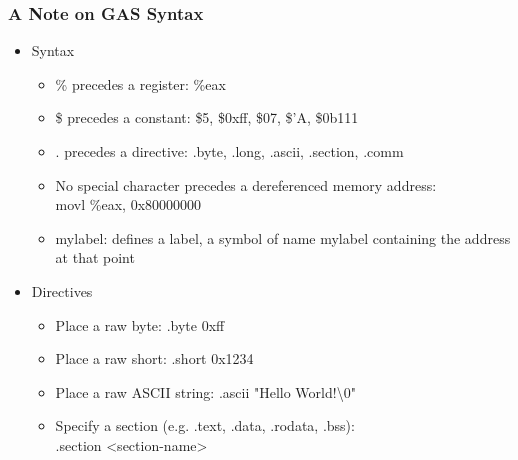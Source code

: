 \documentclass[11pt,xcolor=dvipsnames]{beamer}
\begin{document}
\begin{frame}[fragile,t]
\frametitle{A Note on GAS Syntax}
\begin{itemize}
    \item Syntax
    \begin{itemize}
        \item {\ttfamily \%} precedes a register: {\ttfamily \%eax}
        \item {\ttfamily \$} precedes a constant: {\ttfamily \$5, \$0xff, \$07, \$'A, \$0b111}
        \item {\ttfamily .} precedes a directive: {\ttfamily .byte, .long, .ascii, .section, .comm}
        \item No special character precedes a dereferenced memory address: \\ {\ttfamily movl \%eax, 0x80000000}
        \item {\ttfamily mylabel:} defines a label, a symbol of name {\ttfamily mylabel} containing the address at that point
    \end{itemize}
    \item Directives
    \begin{itemize}
        \item Place a raw byte: {\ttfamily .byte 0xff}
        \item Place a raw short: {\ttfamily .short 0x1234}
        \item Place a raw ASCII string: {\ttfamily .ascii "Hello World!\textbackslash0"}
        \item Specify a section (e.g. .text, .data, .rodata, .bss): \\ {\ttfamily .section <section-name>}
    \end{itemize}
\end{itemize}
\end{frame}
\end{document}
